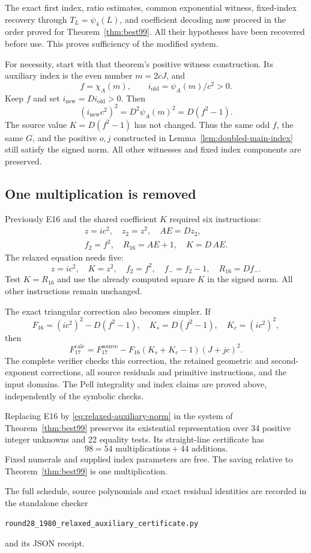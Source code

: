 The exact first index, ratio estimates, common exponential witness,
fixed-index recovery through $T_L=\psi_4(L)$, and coefficient
decoding now proceed in the order proved for
Theorem~\ref{thm:best99}. All their hypotheses have been recovered
before use. This proves sufficiency of the modified system.

For necessity, start with that theorem's positive witness construction.
Its auxiliary index is the even number $m=2cJ$, and
\[
 f=\chi_A(m),\qquad i_{\mathrm{old}}=\psi_A(m)/c^2>0.
\]
Keep $f$ and set $i_{\mathrm{new}}=D i_{\mathrm{old}}>0$. Then
\[
 (i_{\mathrm{new}}c^2)^2
  =D^2\psi_A(m)^2=D(f^2-1).
\]
The source value $K=D(f^2-1)$ has not changed. Thus the same odd
$f$, the same $G$, and the positive $o,j$ constructed in
Lemma~\ref{lem:doubled-main-index} still satisfy the signed norm.
All other witnesses and fixed index components are preserved.

\subsection{One multiplication is removed}

Previously E16 and the shared coefficient $K$ required six
instructions:
\[
 \begin{gathered}
 z=ic^2,\quad z_2=z^2,\quad AE=Dz_2,\\
 f_2=f^2,\quad R_{16}=AE+1,\quad K=D\,AE.
 \end{gathered}
\]
The relaxed equation needs five:
\[
 z=ic^2,\quad K=z^2,\quad f_2=f^2,\quad
 f_-=f_2-1,\quad R_{16}=D f_-.
\]
Test $K=R_{16}$ and use the already computed square $K$ in the
signed norm. All other instructions remain unchanged.

The exact triangular correction also becomes simpler. If
\[
 F_{16}=(ic^2)^2-D(f^2-1),\quad
 K_s=D(f^2-1),\quad K_c=(ic^2)^2,
\]
then
\[
 F_{17}^{\mathrm{calc}}
 =F_{17}^{\mathrm{source}}
  -F_{16}(K_s+K_c-1)(J+jc)^2.
\]
The complete verifier checks this correction, the retained geometric
and second-exponent corrections, all source residuals and primitive
instructions, and the input domains. The Pell integrality and index
claims are proved above, independently of the symbolic checks.

\begin{theorem}\label{thm:best98-pell}
Replacing E16 by \eqref{eq:relaxed-auxiliary-norm} in the system of
Theorem~\ref{thm:best99} preserves its existential representation over
34 positive integer unknowns and 22 equality tests. Its straight-line
certificate has
\[
 \boxed{98=54\text{ multiplications}+44\text{ additions}}.
\]
Fixed numerals and supplied index parameters are free. The saving
relative to Theorem~\ref{thm:best99} is one multiplication.
\end{theorem}

The full schedule, source polynomials and exact residual identities are
recorded in the standalone checker
\begin{center}\small
\texttt{round28\_1980\_relaxed\_auxiliary\_certificate.py}
\end{center}
and its JSON receipt.
